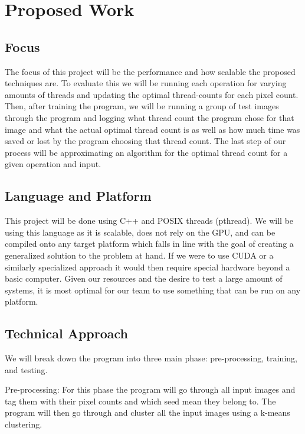 \documentclass{article}
\begin{document}
    \section{Proposed Work}
        \begin{multicols}{2}
            \subsection{Focus}
                The focus of this project will be the performance and how scalable the proposed techniques are.  To evaluate this we will be running each operation for varying amounts of threads and updating the optimal thread-counts for each pixel count.  Then, after training the program, we will be running a group of test images through the program and logging what thread count the program chose for that image and what the actual optimal thread count is as well as how much time was saved or lost by the program choosing that thread count.  The last step of our process will be approximating an algorithm for the optimal thread count for a given operation and input.
            
            \subsection{Language and Platform}
                This project will be done using C++ and POSIX threads (pthread). We will be using this language as it is scalable, does not rely on the GPU, and can be compiled onto any target platform which falls in line with the goal of creating a generalized solution to the problem at hand.  If we were to use CUDA or a similarly specialized approach it would then require special hardware beyond a basic computer.  Given our resources and the desire to test a large amount of systems, it is most optimal for our team to use something that can be run on any platform.
        
            \subsection{Technical Approach}
                We will break down the program into three main phase: pre-processing, training, and testing.
                
                Pre-processing:  For this phase the program will go through all input images and tag them with their pixel counts and which seed mean they belong to.  The program will then go through and cluster all the input images using a k-means clustering.
                

\end{multicols}
\end{document}

